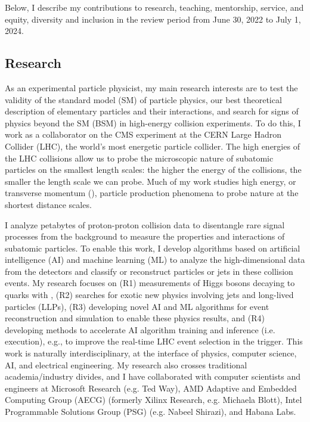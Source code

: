 \documentclass[11pt,letterpaper,notitlepage]{article}
\begin{document}
\pagestyle{fancyplain}

Below, I describe my contributions to research, teaching, mentorship, service, and equity, diversity and inclusion in the review period from June 30, 2022 to July 1, 2024.
\vspace{-1ex}
\subsection*{Research}

As an experimental particle physicist, my main research interests are to test the validity of the standard model (SM) of particle physics, our best theoretical description of elementary particles and their interactions, and search for signs of physics beyond the SM (BSM) in high-energy collision experiments.
To do this, I work as a collaborator on the CMS experiment at the CERN Large Hadron Collider (LHC), the world's most energetic particle collider.
The high energies of the LHC collisions allow us to probe the microscopic nature of subatomic particles on the smallest length scales: the higher the energy of the collisions, the smaller the length scale we can probe.
Much of my work studies high energy, or transverse momentum (\pt), particle production phenomena to probe nature at the shortest distance scales.

I analyze petabytes of proton-proton collision data to disentangle rare signal processes from the background to measure the properties and interactions of subatomic particles.
To enable this work, I develop algorithms based on artificial intelligence (AI) and machine learning (ML) to analyze the high-dimensional data from the detectors and classify or reconstruct particles or jets in these collision events.
My research focuses on
(R1) measurements of Higgs bosons decaying to quarks with \pt,
(R2) searches for exotic new physics involving jets and long-lived particles (LLPs),
(R3) developing novel AI and ML algorithms for event reconstruction and simulation to enable these physics results, and
(R4) developing methods to accelerate AI algorithm training and inference (i.e. execution), e.g., to improve the real-time LHC event selection in the trigger.
This work is naturally interdisciplinary, at the interface of physics, computer science, AI, and electrical engineering.
My research also crosses traditional academia/industry divides, and I have collaborated with computer scientists and engineers at Microsoft Research (e.g. Ted Way), AMD Adaptive and Embedded Computing Group (AECG) (formerly Xilinx Research, e.g. Michaela Blott), Intel Programmable Solutions Group (PSG) (e.g. Nabeel Shirazi), and Habana Labs.
\end{document}
